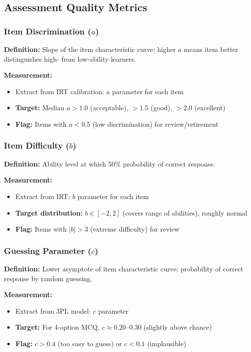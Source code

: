 \documentclass[11pt,letterpaper]{article}
\begin{document}
\subsection{Assessment Quality Metrics}

\subsubsection{Item Discrimination ($a$)}

\textbf{Definition:} Slope of the item characteristic curve; higher $a$ means item better distinguishes high- from low-ability learners.

\textbf{Measurement:}
\begin{itemize}
\item Extract from IRT calibration: $a$ parameter for each item
\item \textbf{Target:} Median $a > 1.0$ (acceptable), $> 1.5$ (good), $> 2.0$ (excellent)
\item \textbf{Flag:} Items with $a < 0.5$ (low discrimination) for review/retirement
\end{itemize}

\subsubsection{Item Difficulty ($b$)}

\textbf{Definition:} Ability level at which 50\% probability of correct response.

\textbf{Measurement:}
\begin{itemize}
\item Extract from IRT: $b$ parameter for each item
\item \textbf{Target distribution:} $b \in [-2, 2]$ (covers range of abilities), roughly normal
\item \textbf{Flag:} Items with $|b| > 3$ (extreme difficulty) for review
\end{itemize}

\subsubsection{Guessing Parameter ($c$)}

\textbf{Definition:} Lower asymptote of item characteristic curve; probability of correct response by random guessing.

\textbf{Measurement:}
\begin{itemize}
\item Extract from 3PL model: $c$ parameter
\item \textbf{Target:} For 4-option MCQ, $c \approx 0.20$--$0.30$ (slightly above chance)
\item \textbf{Flag:} $c > 0.4$ (too easy to guess) or $c < 0.1$ (implausible)
\end{itemize}
\end{document}
